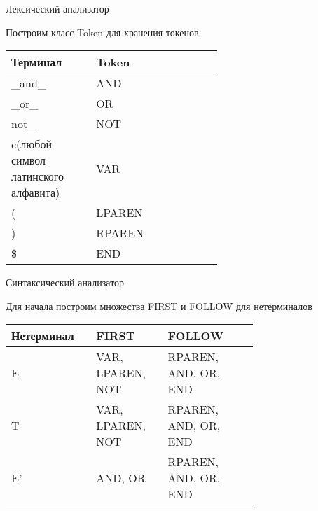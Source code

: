 \begin{para}{Лексический анализатор}

Построим класс Token для хранения токенов.

\begin{table}[h]

\begin{center}

\begin{tabular}{|p{0.2\linewidth}|p{0.4\linewidth}|} 

\hline
\textbf{Терминал} & \textbf{Token}\\
\hline
\_and\_ & AND\\
\hline
\_or\_ & OR\\
\hline
not\_ & NOT\\
\hline
c(любой символ латинского алфавита) & VAR\\
\hline
( & LPAREN\\
\hline
) & RPAREN\\
\hline
\$ & END\\
\hline

\end{tabular}

\end{center}

\end{table}

\end{para}

\newpage

\begin{para}{Синтаксический анализатор}

Для начала построим множества FIRST и FOLLOW для нетерминалов

\begin{table}[h]

\begin{center}

\begin{tabular}{|p{0.2\linewidth}|p{0.2\linewidth}|p{0.3\linewidth}|} 

\hline
\textbf{Нетерминал} & \textbf{FIRST} & \textbf{FOLLOW}\\
\hline
E & VAR, LPAREN, NOT & RPAREN, AND, OR, END\\
\hline
T & VAR, LPAREN, NOT & RPAREN, AND, OR, END\\
\hline
E' & AND, OR & RPAREN, AND, OR, END\\
\hline

\end{tabular}

\end{center}

\end{table}


\end{para}

